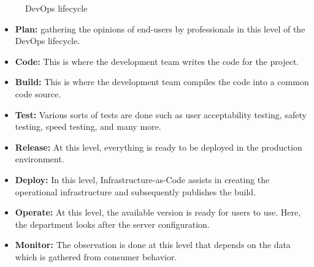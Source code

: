\begin{figure}[htpb]
    \centering
    \caption{DevOps lifecycle}
    \label{fig:devops_lifecycle}
\end{figure}

\begin{itemize}
    \item \textbf{Plan:} gathering the opinions of end-users by professionals in this level of the DevOps lifecycle.
    \item \textbf{Code:} This is where the development team writes the code for the project.
    \item \textbf{Build:} This is where the development team compiles the code into a common code source.
    \item \textbf{Test:} Various sorts of tests are done such as user acceptability testing, safety testing, speed testing, and many more.
    \item \textbf{Release:} At this level, everything is ready to be deployed in the production environment.
    \item \textbf{Deploy:} In this level, Infrastructure-as-Code assists in creating the operational infrastructure and subsequently publishes the build.
    \item \textbf{Operate:} At this level, the available version is ready for users to use. Here, the department looks after the server configuration.
    \item \textbf{Monitor:} The observation is done at this level that depends on the data which is gathered from consumer behavior.
\end{itemize}

